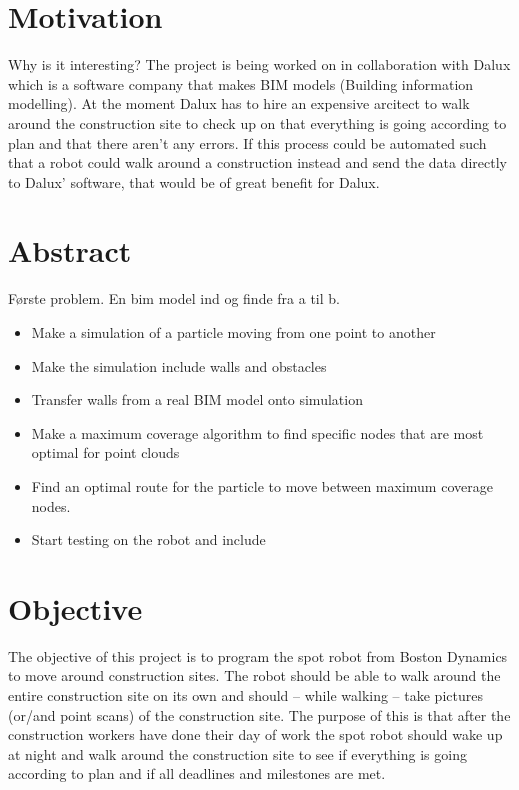 \section*{Motivation}
Why is it interesting?
The project is being worked on in collaboration with Dalux which is a software company that makes BIM models (Building information modelling). At the moment Dalux has to hire an expensive arcitect to walk around the construction site to check up on that everything is going according to plan and that there aren’t any errors. If this process could be automated such that a robot could walk around a construction instead and send the data directly to Dalux’ software, that would be of great benefit for Dalux. 


\section{Abstract}
Første problem. En bim model ind og finde fra a til b.
\begin{itemize}
    \item Make a simulation of a particle moving from one point to another
    \item Make the simulation include walls and obstacles
    \item Transfer walls from a real BIM model onto simulation
    \item Make a maximum coverage algorithm to find specific nodes that are most optimal for point clouds
    \item Find an optimal route for the particle to move between maximum coverage nodes.
    \item Start testing on the robot and include 
\end{itemize}



\section*{Objective}
The objective of this project is to program the spot robot from Boston Dynamics
to move around construction sites. The robot should be able to walk around the entire construction site on its own and should – while walking – take pictures (or/and point scans) of the construction site. The purpose of this is that after the construction workers have done their day of work the spot robot should wake up at night and walk around the construction site to see if everything is going according to plan and if all deadlines and milestones are met.

